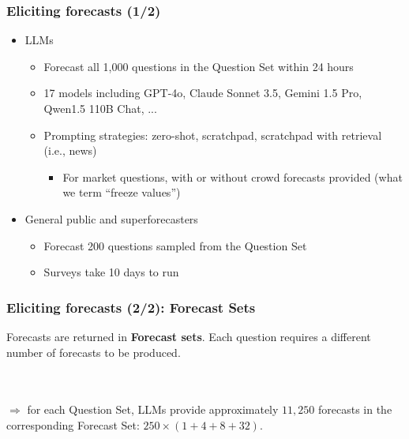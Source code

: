 \documentclass[aspectratio=169]{beamer}
\begin{document}
\begin{frame}
  \frametitle{Eliciting forecasts (1/2)}
  
  \begin{itemize}
  \item LLMs
    \begin{itemize}
    \item Forecast all 1,000 questions in the Question Set within 24 hours
    \item 17 models including GPT-4o, Claude Sonnet 3.5, Gemini 1.5 Pro, Qwen1.5 110B Chat, ...
    \item Prompting strategies: zero-shot, scratchpad, scratchpad with retrieval (i.e., news)
      \begin{itemize}
      \item For market questions, with or without crowd forecasts provided (what we term ``freeze values'')
      \end{itemize}
    \end{itemize}
  \item General public and superforecasters
    \begin{itemize}
    \item Forecast 200 questions sampled from the Question Set
    \item Surveys take 10 days to run
    \end{itemize}
  \end{itemize}
\end{frame}


\begin{frame}
  \frametitle{Eliciting forecasts (2/2): Forecast Sets}
  Forecasts are returned in \textbf{Forecast sets}. Each question requires a different number of forecasts to be produced.\\\ \\

  \ \\$\Rightarrow$ for each Question Set, LLMs provide approximately $11,250$ forecasts in the corresponding Forecast Set: $250\times (1+4+8+32)$.
\end{frame}
\end{document}
